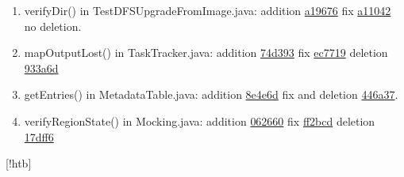 \begin{figure*}[!htb]
\begin{minipage}{1\textwidth}
\begin{enumerate}
\item verifyDir() in TestDFSUpgradeFromImage.java: addition \href{https://github.com/apache/hadoop/commit/a196766ea07775f18ded69bd9e8d239f8cfd3ccc#diff-6bfd89034be79e2f37aae9f211605fff}{a19676}  fix \href{https://github.com/apache/hadoop/commit/a11042#diff-f471412017f4f6728224615c8362da5f}{a11042} no deletion.
\item mapOutputLost() in TaskTracker.java:  addition \href{https://github.com/apache/hadoop/commit/74d393382341939}{74d393} fix  \href{https://github.com/apache/hadoop/commit/ec7719#diff-2bd0b9b3e70406484c416d876341fa61}{ec7719} deletion \href{https://github.com/apache/hadoop/commit/933a6d2c}{933a6d}
\item getEntries() in MetadataTable.java: addition \href{https://github.com/apache/accumulo/commit/8e4e6d6420e47f64b9fd54d9b6f5bc5b0b158b8b#diff-002fc1274cd98bf226ee8398551261a6}{8e4e6d}  fix and deletion \href{https://github.com/apache/accumulo/commit/446a37a#diff-002fc1274cd98bf226ee8398551261a6}{446a37}.
\item verifyRegionState() in Mocking.java: addition \href{https://github.com/apache/hbase/commit/062660e3f48b#diff-76fffa96c664ed27a2f880fd02da3962}{062660}  fix \href{https://github.com/apache/hbase/commit/ff2bcd#diff-53def65a3cf679a3f048ab71bcea9293}{ff2bcd} deletion \href{https://github.com/apache/hbase/commit/17dff6#diff-53def65a3cf679a3f048ab71bcea9293}{17dff6}
\end{enumerate}
 \end{minipage}
  \end{figure*}[!htb]
